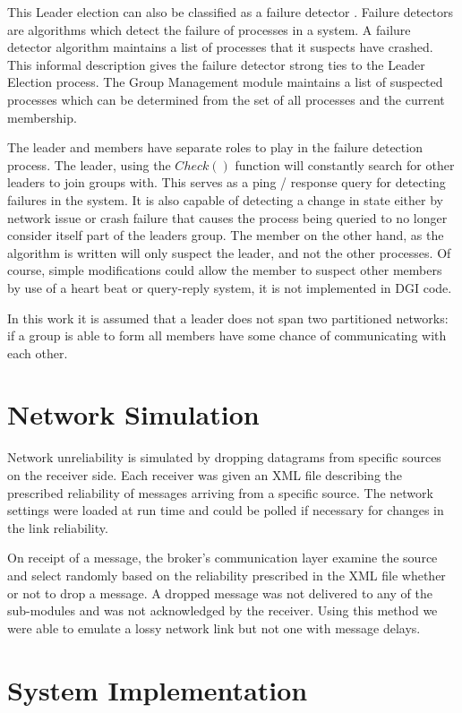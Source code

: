 This Leader election can also be classified as a failure detector 
\cite{LEADERELECTIONEVAL}. Failure detectors are algorithms which detect the failure of processes in a 
system. A failure detector algorithm maintains a list of processes that it suspects have
crashed. This informal description gives the failure detector strong ties to the
Leader Election process. The Group Management module maintains a list of 
suspected processes which can be determined from the set of all processes and the current
membership. 

The leader and members have separate roles to play in the failure detection
process. The leader, using the $Check()$ function will constantly search for 
other leaders to join groups with. This serves as a ping / response query for 
detecting failures in the system. It is also capable of detecting a change in state either
by network issue or crash failure that causes the process being queried to no 
longer consider itself part of the leaders group. The member on the other hand, as the
algorithm is written will only suspect the leader, and not the other processes.
Of course, simple modifications could allow the member to suspect other members
by use of a heart beat or query-reply system, it is not implemented in DGI code.

In this work it is assumed that a leader does not span two partitioned networks:
if a group is able to form all members have some chance of communicating with
each other.

\section{Network Simulation}

Network unreliability is simulated by dropping datagrams from specific sources 
on the receiver side. Each receiver was given an XML file describing the 
prescribed reliability of messages arriving from a specific source. The 
network settings were loaded at run time and could be polled if necessary for 
changes in the link reliability.

On receipt of a message, the broker's communication layer examine the source 
and select randomly based on the reliability prescribed in the XML file whether 
or not to drop a message. A dropped message was not delivered to any of the 
sub-modules and was not acknowledged by the receiver. Using this method we were 
able to emulate a lossy network link but not one with message delays.

\section{System Implementation}

